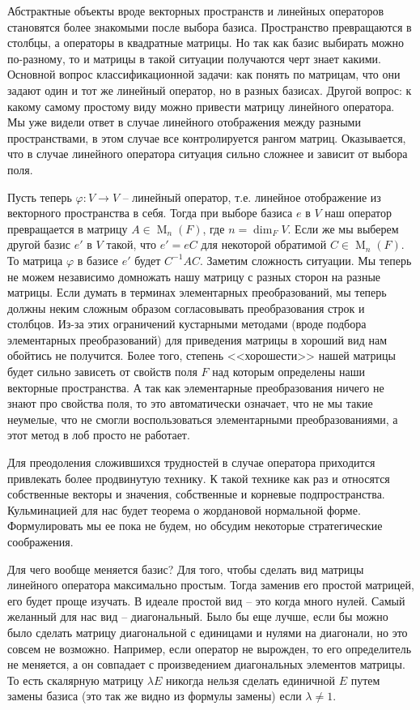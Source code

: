 Абстрактные объекты вроде векторных пространств и линейных операторов становятся более знакомыми после выбора базиса.
Пространство превращаются в столбцы, а операторы в квадратные матрицы.
Но так как базис выбирать можно по-разному, то и матрицы в такой ситуации получаются черт знает какими.
Основной вопрос классификационной задачи: как понять по матрицам, что они задают один и тот же линейный оператор, но в разных базисах.
Другой вопрос: к какому самому простому виду можно привести матрицу линейного оператора.
Мы уже видели ответ в случае линейного отображения между разными пространствами, в этом случае все контролируется рангом матриц.
Оказывается, что в случае линейного оператора ситуация сильно сложнее и зависит от выбора поля.


Пусть теперь $\varphi\colon V\to V$ -- линейный оператор, т.е. линейное отображение из векторного пространства в себя.
Тогда при выборе базиса $e$ в $V$ наш оператор превращается в матрицу $A\in \operatorname{M}_n(F)$, где $n = \dim_F V$.
Если же мы выберем другой базис $e'$ в $V$ такой, что $e' = eC$ для некоторой обратимой $C \in \operatorname{M}_n(F)$.
То матрица $\varphi$ в базисе $e'$ будет $C^{-1}AC$.
Заметим сложность ситуации.
Мы теперь не можем независимо домножать нашу матрицу с разных сторон на разные матрицы.
Если думать в терминах элементарных преобразований, мы теперь должны неким сложным образом согласовывать преобразования строк и столбцов.
Из-за этих ограничений кустарными методами (вроде подбора элементарных преобразований) для приведения матрицы в хороший вид нам обойтись не получится.
Более того, степень <<хорошести>> нашей матрицы будет сильно зависеть от свойств поля $F$ над которым определены наши векторные пространства.
А так как элементарные преобразования ничего не знают про свойства поля, то это автоматически означает, что не мы такие неумелые, что не смогли воспользоваться элементарными преобразованиями, а этот метод в лоб просто не работает.

Для преодоления сложившихся трудностей в случае оператора приходится привлекать более продвинутую технику.
К такой технике как раз и относятся собственные векторы и значения, собственные и корневые подпространства.
Кульминацией для нас будет теорема о жордановой нормальной форме.
Формулировать мы ее пока не будем, но обсудим некоторые стратегические соображения.

Для чего вообще меняется базис?
Для того, чтобы сделать вид матрицы линейного оператора максимально простым.
Тогда заменив его простой матрицей, его будет проще изучать.
В идеале простой вид -- это когда много нулей.
Самый желанный для нас вид -- диагональный.
Было бы еще лучше, если бы можно было сделать матрицу диагональной с единицами и нулями на диагонали, но это совсем не возможно.
Например, если оператор не вырожден, то его определитель не меняется, а он совпадает с произведением диагональных элементов матрицы.
То есть скалярную матрицу $\lambda E$ никогда нельзя сделать единичной $E$ путем замены базиса (это так же видно из формулы замены) если $\lambda \neq 1$.


